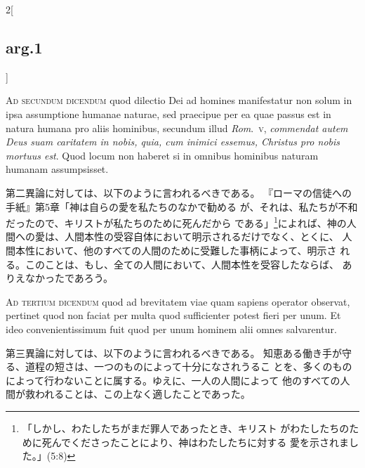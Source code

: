 \documentclass[paper=a4paper,fontsize=10pt,jafontsize=9pt,titlepage]{jlreq}
\begin{document}
\begin{paracol}{2}[\subsection{arg.1}]
\switchcolumn*[\subsection{ad.2}]

{\scshape Ad secundum dicendum} quod dilectio Dei ad homines manifestatur non solum
in ipsa assumptione humanae naturae, sed praecipue per ea quae passus
est in natura humana pro aliis hominibus, secundum illud {\itshape Rom}.~{\scshape v},
{\itshape commendat autem Deus suam caritatem in nobis, quia, cum inimici essemus,
Christus pro nobis mortuus est}. Quod locum non haberet si in omnibus
hominibus naturam humanam assumpsisset.

\switchcolumn

第二異論に対しては、以下のように言われるべきである。
『ローマの信徒への手紙』第5章「神は自らの愛を私たちのなかで勧める
 が、それは、私たちが不和だったので、キリストが私たちのために死んだから
 である」\footnote{「しかし、わたしたちがまだ罪人であったとき、キリスト
 がわたしたちのために死んでくださったことにより、神はわたしたちに対する
 愛を示されました。」(5:8)}によれば、神の人間への愛は、人間本性の受容自体において明示されるだけでなく、とくに、
 人間本性において、他のすべての人間のために受難した事柄によって、明示さ
 れる。このことは、もし、全ての人間において、人間本性を受容したならば、
 ありえなかったであろう。

\switchcolumn*[\subsection{ad.3}]

{\scshape Ad tertium dicendum} quod ad brevitatem viae quam sapiens operator
observat, pertinet quod non faciat per multa quod sufficienter potest
fieri per unum. Et ideo convenientissimum fuit quod per unum hominem
alii omnes salvarentur.

\switchcolumn

第三異論に対しては、以下のように言われるべきである。
知恵ある働き手が守る、道程の短さは、一つのものによって十分になされうるこ
 とを、多くのものによって行わないことに属する。ゆえに、一人の人間によって
 他のすべての人間が救われることは、この上なく適したことであった。

\end{paracol}
\newpage
\end{document}
